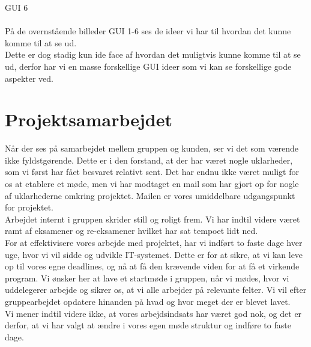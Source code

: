 \documentclass[a4paper]{article}
\begin{document}
GUI 6\\\\
På de overnstående billeder GUI 1-6 ses de ideer vi har til hvordan det kunne komme til at se ud.\\
Dette er dog stadig kun ide face af hvordan det muligtvis kunne komme til at se ud, derfor har vi en masse forskellige GUI ideer som vi kan se forskellige gode aspekter ved.
\section{Projektsamarbejdet}
Når der ses på samarbejdet mellem gruppen og kunden, ser vi det som værende ikke fyldstgørende. Dette er i den forstand, at der har været nogle uklarheder, som vi først har fået besvaret relativt sent. Det har endnu ikke været muligt for os at etablere et møde, men vi har modtaget en mail som har gjort op for nogle af uklarhederne omkring projektet. Mailen er vores umiddelbare udgangspunkt for projektet.\\
Arbejdet internt i gruppen skrider still og roligt frem. Vi har indtil videre været ramt af eksamener og re-eksamener hvilket har sat tempoet lidt ned.\\
For at effektivisere vores arbejde med projektet, har vi indført to faste dage hver uge, hvor vi vil sidde og udvikle IT-systemet. Dette er for at sikre, at vi kan leve op til vores egne deadlines, og nå at få den krævende viden for at få et virkende program. Vi ønsker her at lave et startmøde i gruppen, når vi mødes, hvor vi uddelegerer arbejde og sikrer os, at vi alle arbejder på relevante felter. Vi vil efter gruppearbejdet opdatere hinanden på hvad og hvor meget der er blevet lavet.\\
Vi mener indtil videre ikke, at vores arbejdsindsats har været god nok, og det er derfor, at vi har valgt at ændre i vores egen møde struktur og indføre to faste dage.
\newpage
\end{document}
